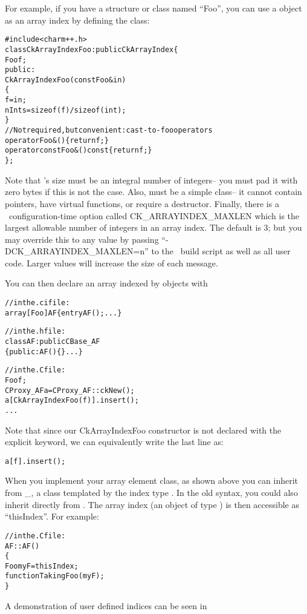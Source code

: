 For example, if you have a structure or class named ``Foo'', you 
can use a  object as an array index by defining the class:

\begin{alltt}
#include <charm++.h>
class CkArrayIndexFoo:public CkArrayIndex \{
    Foo f;
public:
    CkArrayIndexFoo(const Foo \&in) 
    \{
        f=in;
        nInts=sizeof(f)/sizeof(int);
    \}
    //Not required, but convenient: cast-to-foo operators
    operator Foo &() \{return f;\}
    operator const Foo &() const \{return f;\}
\};
\end{alltt}

Note that 's size must be an integral number of integers--
you must pad it with zero bytes if this is not the case.
Also,  must be a simple class-- it cannot contain 
pointers, have virtual functions, or require a destructor.
Finally, there is a \charmpp\ configuration-time option called
CK\_ARRAYINDEX\_MAXLEN  
which is the largest allowable number of 
integers in an array index.  The default is 3; but you may 
override this to any value by passing ``-DCK\_ARRAYINDEX\_MAXLEN=n'' 
to the \charmpp\ build script as well as all user code. Larger 
values will increase the size of each message.

You can then declare an array indexed by  objects with

\begin{alltt}
//in the .ci file:
array [Foo] AF \{ entry AF(); ... \}

//in the .h file:
class AF : public CBase\_AF
\{ public: AF() \{\} ... \}

//in the .C file:
    Foo f;
    CProxy_AF a=CProxy_AF::ckNew();
    a[CkArrayIndexFoo(f)].insert();
    ...
\end{alltt}

Note that since our CkArrayIndexFoo constructor is not declared
with the explicit keyword, we can equivalently write the last line as:

\begin{alltt}
    a[f].insert();
\end{alltt}

When you implement your array element class, as shown above you 
can inherit from \_, 
a class templated by the index type . In the old syntax,
you could also inherit directly from .
The array index (an object of type ) is then accessible as 
``thisIndex''. For example:

\begin{alltt}

//in the .C file:
AF::AF()
\{
    Foo myF=thisIndex;
    functionTakingFoo(myF);
\}
\end{alltt}

A demonstration of user defined indices can be seen in


